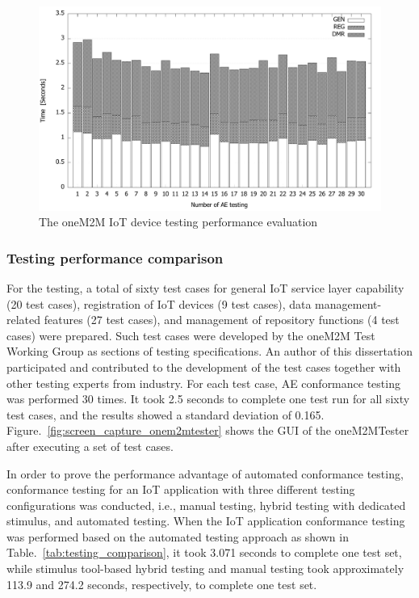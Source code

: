 \begin{figure}[H]			%
	\centering
	\includegraphics[width=\textwidth]{figures/fig_ae_testing_result.pdf}
    \caption{The oneM2M IoT device testing performance evaluation}
    \label{fig:the_onem2m_device_testing_performance}
\end{figure}


\subsubsection{Testing performance comparison}
For the testing, a total of sixty test cases for general IoT service layer capability (20 test cases), registration of IoT devices (9 test cases), data management-related features (27 test cases), and management of repository functions (4 test cases) were prepared. Such test cases were developed by the oneM2M Test Working Group as sections of testing specifications. An author of this dissertation participated and contributed to the development of the test cases together with other testing experts from industry. For each test case, AE conformance testing was performed 30 times. It took 2.5 seconds to complete one test run for all sixty test cases, and the results showed a standard deviation of 0.165. Figure.~\ref{fig:screen_capture_onem2mtester} shows the GUI of the oneM2MTester after executing a set of test cases.



In order to prove the performance advantage of automated conformance testing, conformance testing for an IoT application with three different testing configurations was conducted, i.e., manual testing, hybrid testing with dedicated stimulus, and automated testing. When the IoT application conformance testing was performed based on the automated testing approach as shown in Table.~\ref{tab:testing_comparison}, it took 3.071 seconds to complete one test set, while stimulus tool-based hybrid testing and manual testing took approximately 113.9 and 274.2 seconds, respectively, to complete one test set.

